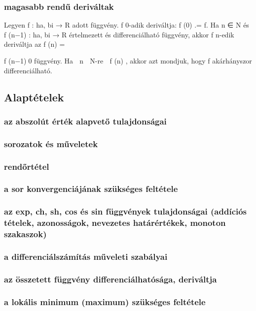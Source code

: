 \documentclass[12pt]{article}
\begin{document}
\subsubsection{magasabb rendű deriváltak}

Legyen f : ha, bi → R adott függvény. f 0-adik deriváltja:
f
(0) .= f. Ha n ∈ N és f
(n−1) : ha, bi → R értelmezett és differenciálható
függvény, akkor f n-edik deriváltja az f
(n) =

f
(n−1)0
függvény.
Ha ∀ n ∈ N-re ∃ f
(n)
, akkor azt mondjuk, hogy f akárhányszor differenciálható.

 
\subsection{Alaptételek}

\subsubsection{az abszolút érték alapvető tulajdonságai}
\subsubsection{sorozatok és műveletek}
\subsubsection{rendőrtétel}
\subsubsection{a sor konvergenciájának szükséges feltétele}
\subsubsection{az exp, ch, sh, cos és sin függvények tulajdonságai (addíciós tételek, azonosságok, nevezetes határértékek, monoton szakaszok)}
\subsubsection{a differenciálszámítás műveleti szabályai}
\subsubsection{az összetett függvény differenciálhatósága, deriváltja}
\subsubsection{a lokális minimum (maximum) szükséges feltétele}
\end{document}
